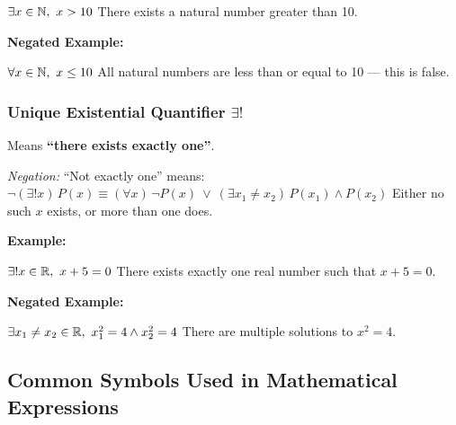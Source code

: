 \(\exists x \in \mathbb{N},\ x > 10\) There exists a natural number greater than 10.
			
\textbf{Negated Example:}  

\(\forall x \in \mathbb{N},\ x \leq 10\) All natural numbers are less than or equal to 10 — this is false.

\subsubsection{Unique Existential Quantifier \texorpdfstring{\(\exists ! \)}{}} 
	
Means \textbf{``there exists exactly one''}.
		
\emph{Negation:} ``Not exactly one'' means:
\(\neg (\exists! x)\, P(x) \equiv (\forall x)\, \neg P(x)\ \lor\ (\exists x_1 \neq x_2)\, P(x_1) \land 
P(x_2)\) Either no such \(x\) exists, or more than one does.

\textbf{Example:} 

\(\exists! x \in \mathbb{R},\ x + 5 = 0\) There exists exactly one real number such that \( x + 5 = 0 \).

\textbf{Negated Example:}  

\(\exists x_1 \neq x_2 \in \mathbb{R},\ x_1^2 = 4 \land x_2^2 = 4\) There are multiple solutions to 
\( x^2 = 4 \).

\subsection{Common Symbols Used in Mathematical Expressions}

